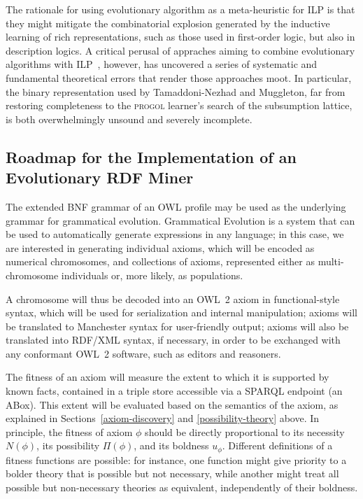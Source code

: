 \documentclass[a4paper]{article}
\newcounter{ex}
\begin{document}
The rationale for using evolutionary algorithm as a meta-heuristic for ILP is that
they might mitigate the combinatorial explosion generated by the inductive learning
of rich representations, such as those used in first-order logic, but also in description logics.
A critical perusal of appraches aiming to combine evolutionary algorithms with
ILP~\cite{Marginean2003}, however, has uncovered a series of systematic and fundamental
theoretical errors that render those approaches moot. In particular, the binary
representation used by Tamaddoni-Nezhad and Muggleton, far from restoring completeness
to the \textsc{progol} learner's search of the subsumption lattice, is both overwhelmingly
unsound and severely incomplete.

\subsection{Roadmap for the Implementation of an Evolutionary RDF Miner}

The extended BNF grammar of an OWL profile may be used as the underlying grammar for grammatical evolution.
Grammatical Evolution is a system that can be used to automatically generate expressions
in any language; in this case, we are interested in generating individual axioms, which
will be encoded as numerical chromosomes, and collections of axioms, represented
either as multi-chromosome individuals or, more likely, as populations.

A chromosome will thus be decoded into an OWL~2 axiom in functional-style syntax,
which will be used for serialization and internal manipulation;
axioms will be translated to Manchester syntax for user-friendly output;
axioms will also be translated into RDF/XML syntax, if necessary, in order to be exchanged
with any conformant OWL~2 software, such as editors and reasoners.

The fitness of an axiom will measure the extent to which it is supported
by known facts, contained in a triple store accessible via a SPARQL endpoint
(an ABox). This extent will be evaluated based on the semantics of the axiom,
as explained in Sections~\ref{axiom-discovery} and \ref{possibility-theory} above.
In principle, the fitness of axiom $\phi$ should be directly proportional to
its necessity $N(\phi)$, its possibility $\Pi(\phi)$, and its boldness $u_\phi$.
Different definitions of a fitness functions are possible: for instance, one
function might give priority to a bolder theory that is possible but not necessary,
while another might treat all possible but non-necessary theories as equivalent,
independently of their boldness.
\end{document}
